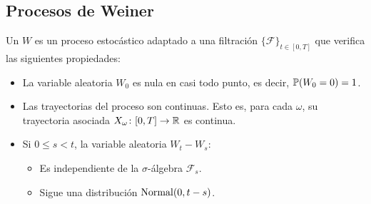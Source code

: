 \subsection{Procesos de Weiner}
\begin{definicion}
    \label{def:proceso_weiner}
    Un  $W$ es un proceso estocástico adaptado a una filtración $\{\mathcal{F}\}_{t\in[0,T]}$ que verifica las siguientes propiedades:
    \begin{itemize}
        \item La variable aleatoria $W_0$ es nula en casi todo punto, es decir, $\mathbb{P}(W_0=0)=1$.
        \item Las trayectorias del proceso son continuas. Esto es, para cada $\omega$, su trayectoria asociada $X_\omega\colon[0,T]\to\mathbb{R}$ es continua.
        \item Si $0\leq s<t$, la variable aleatoria $W_t-W_s$:
              \begin{itemize}
                  \item Es independiente de la $\sigma$-álgebra $\mathcal{F}_s$.
                  \item Sigue una distribución $\operatorname{Normal}(0,t-s)$.
              \end{itemize}
    \end{itemize}
\end{definicion}